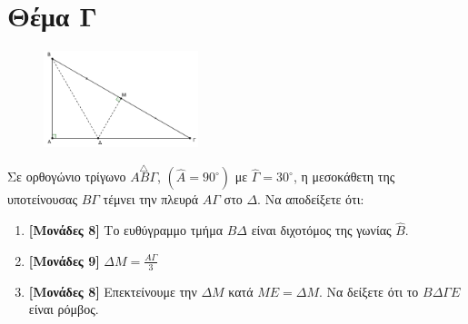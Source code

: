\documentclass[12pt]{article}
\begin{document}
\section*{Θέμα Γ}
  \noindent
  \begin{figure}
    \centering
    \vspace{-50pt}
    \includegraphics[width=0.4\textwidth]{2017AGeo3}
  \end{figure}
  Σε ορθογώνιο τρίγωνο $\overset{\triangle}{ΑΒΓ}$, $\left( \hat{Α}=  90^{\circ} \right)$ με $\hat{Γ}=30^{\circ}$, η μεσοκάθετη της υποτείνουσας $ΒΓ$ τέμνει την πλευρά $ΑΓ$ στο $Δ$. Να αποδείξετε ότι:
  \begin{enumerate}
    \item \textbf{[Μονάδες 8]} Το ευθύγραμμο τμήμα $ΒΔ$ είναι διχοτόμος της γωνίας $\hat{Β}$.
    \item \textbf{[Μονάδες 9]} $ΔΜ=\frac{ΑΓ}{3}$
    \item \textbf{[Μονάδες 8]} Επεκτείνουμε την $ΔΜ$ κατά $ΜΕ=ΔΜ$. Να δείξετε ότι το $ΒΔΓΕ$ είναι ρόμβος.
  \end{enumerate}
\end{document}

